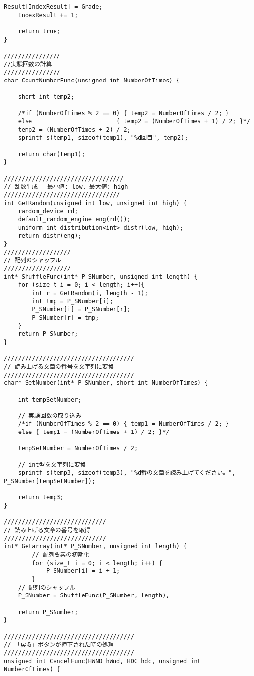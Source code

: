 \begin{lstlisting}[caption=main.cpp]
	Result[IndexResult] = Grade;
	IndexResult += 1;

	return true;
}

////////////////
//実験回数の計算
////////////////
char CountNumberFunc(unsigned int NumberOfTimes) {

	short int temp2;

	/*if (NumberOfTimes % 2 == 0) { temp2 = NumberOfTimes / 2; }
	else                        { temp2 = (NumberOfTimes + 1) / 2; }*/
	temp2 = (NumberOfTimes + 2) / 2;
	sprintf_s(temp1, sizeof(temp1), "%d回目", temp2);

	return char(temp1);
}

//////////////////////////////////
// 乱数生成 　最小値: low, 最大値: high
/////////////////////////////////
int GetRandom(unsigned int low, unsigned int high) {
	random_device rd;
	default_random_engine eng(rd());
	uniform_int_distribution<int> distr(low, high);
	return distr(eng);
}
///////////////////
// 配列のシャッフル
///////////////////
int* ShuffleFunc(int* P_SNumber, unsigned int length) {
	for (size_t i = 0; i < length; i++){
		int r = GetRandom(i, length - 1);
		int tmp = P_SNumber[i];
		P_SNumber[i] = P_SNumber[r];
		P_SNumber[r] = tmp;
	}
	return P_SNumber;
}

/////////////////////////////////////
// 読み上げる文章の番号を文字列に変換
/////////////////////////////////////
char* SetNumber(int* P_SNumber, short int NumberOfTimes) {

	int tempSetNumber;
	
	// 実験回数の取り込み
	/*if (NumberOfTimes % 2 == 0) { temp1 = NumberOfTimes / 2; }
	else { temp1 = (NumberOfTimes + 1) / 2; }*/

	tempSetNumber = NumberOfTimes / 2;

	// int型を文字列に変換
	sprintf_s(temp3, sizeof(temp3), "%d番の文章を読み上げてください。", P_SNumber[tempSetNumber]);

	return temp3;
}

/////////////////////////////
// 読み上げる文章の番号を取得
/////////////////////////////
int* Getarray(int* P_SNumber, unsigned int length) {
		// 配列要素の初期化
		for (size_t i = 0; i < length; i++) {
			P_SNumber[i] = i + 1; 
		}
	// 配列のシャッフル
	P_SNumber = ShuffleFunc(P_SNumber, length);

	return P_SNumber;
}

/////////////////////////////////////
// 「戻る」ボタンが押下された時の処理
/////////////////////////////////////
unsigned int CancelFunc(HWND hWnd, HDC hdc, unsigned int NumberOfTimes) {


\end{lstlisting}
